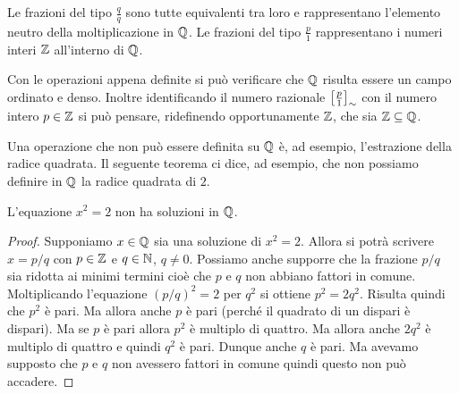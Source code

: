 Le frazioni del tipo $\frac{q}{q}$ sono tutte equivalenti tra loro e rappresentano 
l'elemento neutro della moltiplicazione in ${\mathbb Q}$.
Le frazioni del tipo $\frac{p}{1}$ rappresentano 
i numeri interi ${\mathbb Z}$ all'interno di ${\mathbb Q}$.

Con le operazioni appena definite si può verificare che ${\mathbb Q}$ 
risulta essere un campo ordinato e denso.
Inoltre identificando il numero razionale ${\left[ \frac p 1 \right]}_\sim$
con il numero intero $p\in {\mathbb Z}$ si può pensare, ridefinendo opportunamente 
${\mathbb Z}$, che sia ${\mathbb Z} \subseteq {\mathbb Q}$.

Una operazione che non può essere definita su ${\mathbb Q}$ è, ad esempio, 
l'estrazione della radice quadrata. 
Il seguente teorema ci dice, ad esempio, che non possiamo definire in 
${\mathbb Q}$ la radice quadrata di $2$.

\begin{theorem}
  \mymark{**}%
  \label{th:pitagora}%
  L'equazione $x^2=2$ non ha soluzioni in ${\mathbb Q}$.
  \end{theorem}
  \begin{proof}
  \mymark{*}%
  Supponiamo $x\in {\mathbb Q}$ sia una soluzione di $x^2=2$.
  Allora si potrà scrivere $x=p/q$ con $p\in {\mathbb Z}$ e $q\in {\mathbb N}$, $q\neq 0$.
  Possiamo anche supporre che la frazione $p/q$ sia ridotta ai minimi
  termini cioè che $p$ e $q$ non abbiano fattori in comune.
  Moltiplicando l'equazione
  $(p/q)^2=2$ per $q^2$ si ottiene $p^2 = 2 q^2$.
  Risulta quindi che $p^2$ è pari.
  Ma allora anche $p$ è pari (perché il quadrato di un dispari è dispari).
  Ma se $p$ è pari allora $p^2$ è multiplo di quattro.
  Ma allora anche $2q^2$ è multiplo di quattro e quindi $q^2$ è pari.
  Dunque anche $q$ è pari. Ma avevamo supposto che $p$ e $q$ non avessero
  fattori in comune quindi questo non può accadere.
\end{proof}

